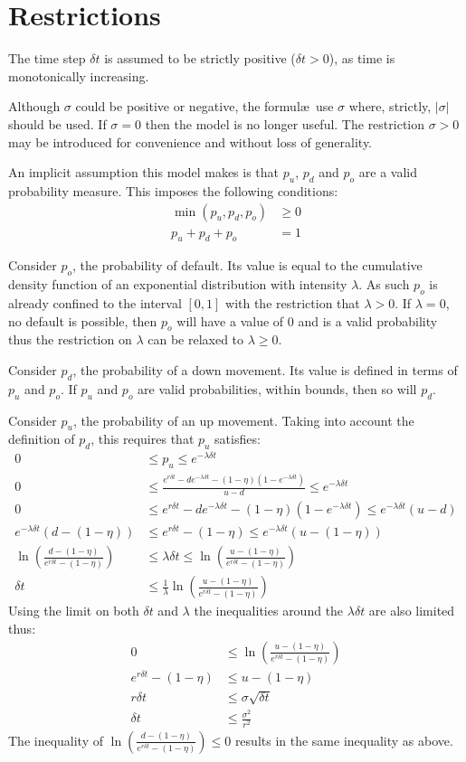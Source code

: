 \documentclass[a4paper,11pt,oneside]{report}
\theoremstyle{plain}
\theoremstyle{definition}
\def\n{\nonumber\\}
\def\Dt{\ensuremath{\delta t}\xspace}
\def\u{\ensuremath{u}\xspace}
\def\d{\ensuremath{d}\xspace}
\def\o{\ensuremath{o}\xspace}
\def\pu{\ensuremath{p_\u}\xspace}
\def\pd{\ensuremath{p_\d}\xspace}
\def\po{\ensuremath{p_\o}\xspace}
\begin{document}

\section{Restrictions}
The time step \Dt is assumed to be strictly positive ($\Dt > 0$), as time is monotonically increasing.

Although $\sigma$ could be positive or negative, the formul\ae\ use $\sigma$ where, strictly, $|\sigma|$ should be used.  If $\sigma = 0$ then the model is no longer useful.  The restriction $\sigma > 0$ may be introduced for convenience and without loss of generality.

An implicit assumption this model makes is that \pu, \pd and \po are a valid probability measure.  This imposes the following conditions:
\begin{align}
 \min(\pu, \pd, \po) &\ge 0 \\
 \pu + \pd + \po &= 1 \label{eq:bin_prob_limit}
\end{align}

Consider \po, the probability of default.  Its value is equal to the cumulative density function of an exponential distribution with intensity $\lambda$.  As such \po is already confined to the interval $[0, 1]$ with the restriction that $\lambda > 0$.  If $\lambda = 0$, no default is possible, then \po will have a value of 0 and is a valid probability thus the restriction on $\lambda$ can be relaxed to $\lambda \ge 0$.

Consider \pd, the probability of a down movement.  Its value is defined in terms of \pu and \po.  If \pu and \po are valid probabilities, within bounds, then so will \pd.

Consider \pu, the probability of an up movement.  Taking into account the definition of \pd, this requires that \pu satisfies:
\begin{align}
 0 &\le \pu \le e^{-\lambda \Dt} \\
 0 &\le \frac{e^{r\Dt} - \d e^{-\lambda\Dt} - (1 - \eta)(1 - e^{-\lambda\Dt})}{\u - \d} \le e^{-\lambda \Dt} \n
 0 &\le e^{r\Dt} - \d e^{-\lambda\Dt} - (1 - \eta)(1 - e^{-\lambda\Dt}) \le e^{-\lambda \Dt}(\u - \d) \n
 e^{-\lambda\Dt}(\d - (1 - \eta)) &\le e^{r\Dt} - (1 - \eta) \le e^{-\lambda\Dt}(\u - (1 - \eta)) \n
 \ln\left(\frac{d - (1 - \eta)}{e^{r\Dt} - (1 - \eta)}\right) &\le \lambda\Dt \le \ln\left(\frac{u - (1 - \eta)}{e^{r\Dt} - (1 - \eta)}\right) \\
 \Dt &\le \frac{1}{\lambda}\ln\left(\frac{u - (1 - \eta)}{e^{r\Dt} - (1 - \eta)}\right)
\end{align}
Using the limit on both \Dt and $\lambda$ the inequalities around the $\lambda\Dt$ are also limited thus:
\begin{align}
 0 &\le \ln\left(\frac{u - (1 - \eta)}{e^{r\Dt} - (1 - \eta)}\right) \n
 e^{r\Dt} - (1 - \eta) &\le u - (1 - \eta) \n
 r\Dt &\le \sigma \sqrt{\Dt} \n
 \Dt &\le \frac{\sigma^2}{r^2}
\end{align}
The inequality of $\ln\left(\frac{d - (1 - \eta)}{e^{r\Dt} - (1 - \eta)}\right) \le 0$ results in the same inequality as above.
\end{document}
